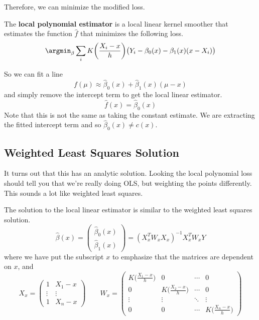   Therefore, we can minimize the modified loss. 

  \begin{definition}
    The \textbf{local polynomial estimator} is a local linear kernel smoother that estimates the function $\hat{f}$ that minimizes the following loss. 
    \begin{equation}
      \argmin_{\beta} \sum_i K \bigg( \frac{X_i - x}{h} \bigg) \big( Y_i - \beta_0 (x) - \beta_1 (x) (x- X_i)\big)
    \end{equation}
  \end{definition}

  So we can fit a line 
  \begin{equation}
    f(\mu) \approx \hat{\beta}_0 (x) + \hat{\beta}_1 (x) (\mu - x)
  \end{equation}
  and simply remove the intercept term to get the local linear estimator. 
  \begin{equation}
    \hat{f}(x) = \hat{\beta}_0 (x)
  \end{equation}
  Note that this is not the same as taking the constant estimate. We are extracting the fitted intercept term and so $\hat{\beta}_0(x) \neq c(x)$. 

\subsection{Weighted Least Squares Solution}

  It turns out that this has an analytic solution. Looking the local polynomial loss should tell you that we're really doing OLS, but weighting the points differently. This sounds a lot like weighted least squares. 

  \begin{theorem}
    The solution to the local linear estimator is similar to the weighted least squares solution. 
    \begin{equation}
      \hat{\beta}(x) = \begin{pmatrix} \hat{\beta}_0 (x) \\ \hat{\beta}_1 (x) \end{pmatrix} = (X_x^T W_x X_x)^{-1} X_x^T W_x Y
    \end{equation}
    where we have put the subscript $x$ to emphasize that the matrices are dependent on $x$, and 
    \begin{equation}
      X_x = \begin{pmatrix} 1 & X_1 - x \\ \vdots & \vdots \\ 1 & X_n - x \end{pmatrix} \qquad W_x = \begin{pmatrix} K \big( \frac{X_1 - x}{h} \big) & 0 & \cdots & 0 \\ 0 & K \big( \frac{X_2 - x}{h} \big) & \cdots & 0 \\ \vdots & \vdots & \ddots & \vdots \\ 0 & 0 & \cdots & K \big( \frac{X_n - x}{h} \big) \end{pmatrix}
    \end{equation}
  \end{theorem}

